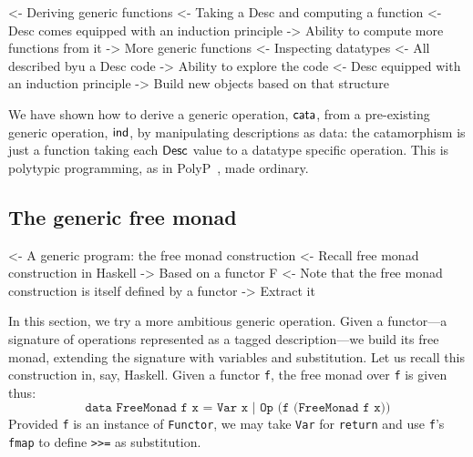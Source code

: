 \begin{wstructure}
<- Deriving generic functions
    <- Taking a Desc and computing a function
        <- Desc comes equipped with an induction principle
        -> Ability to compute more functions from it
            -> More generic functions
    <- Inspecting datatypes
        <- All described byu a Desc code
        -> Ability to explore the code
            <- Desc equipped with an induction principle
            -> Build new objects based on that structure
\end{wstructure}

We have shown how to derive a generic
operation, \(\cata\), from a pre-existing generic operation,
\(\F{ind}\), by
manipulating descriptions as data: the catamorphism is just a
function taking each $\Desc$ value to a datatype specific
operation. This is polytypic programming, as in
PolyP~\cite{jansson:polyp}, made ordinary.


\subsection{The generic free monad}
\label{sec:desc-free-monad}

\begin{wstructure}
<- A generic program: the free monad construction
    <- Recall free monad construction in Haskell
        -> Based on a functor F
    <- Note that the free monad construction is itself defined by a functor
        -> Extract it
\end{wstructure}

In this section, we try a more ambitious generic operation. Given a
functor---a signature of operations represented as a tagged
description---we build its free monad, extending the signature with
variables and substitution.
%
\newcommand{\FMFreeMonad}{\D{FreeMonad}}
\newcommand{\FMFreeMonadD}{\D{FreeMonadD}}
\newcommand{\FMVar}{\C{Var}}
\newcommand{\FMComposite}{\C{Composite}}
%
Let us recall this construction in, say, Haskell. Given a
functor \texttt{f}, the free monad over \texttt{f} is given
thus:
%
\[
\texttt{data FreeMonad f x = Var x | Op (f (FreeMonad f x))}
\]
%
Provided \texttt{f} is an instance of \texttt{Functor}, we may
take \texttt{Var} for \texttt{return} and use \texttt{f}'s
\texttt{fmap} to define \texttt{>>=} as substitution.

